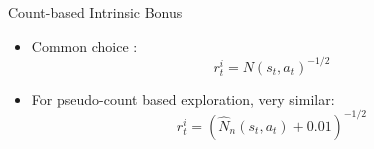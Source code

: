 \documentclass[aspectratio=169]{../latex_main/tntbeamer}  %
\begin{document}
\begin{frame}[c]{Count-based Intrinsic Bonus}
	
	\begin{itemize}
		\item Common choice :
		$$r_t^i = N(s_t, a_t)^{-1/2}$$
		\item For pseudo-count based exploration, very similar:
		$$r_t^i = (\hat{N}_n (s_t, a_t) + 0.01)^{-1/2} $$
	\end{itemize}
	
\end{frame}
\end{document}
